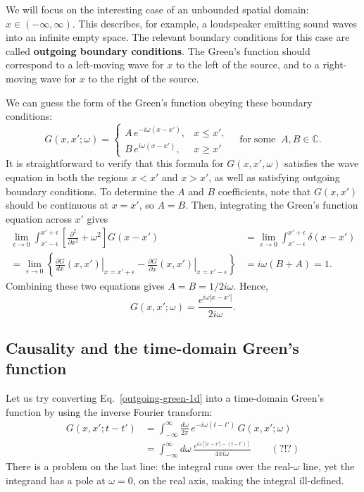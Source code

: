 \documentclass[10pt,a4paper]{article}
\begin{document}
We will focus on the interesting case of an unbounded spatial domain:
$x \in (-\infty, \infty)$. This describes, for example, a loudspeaker
emitting sound waves into an infinite empty space. The relevant
boundary conditions for this case are called \textbf{outgoing boundary
  conditions}. The Green's function should correspond to a left-moving
wave for $x$ to the left of the source, and to a right-moving wave for
$x$ to the right of the source.

We can guess the form of the Green's function obeying these boundary
conditions:
\begin{equation}
G(x,x';\omega) = \left\{\begin{array}{ll}A \, e^{-i\omega (x-x')}, & x \le x', \\ B \, e^{i\omega (x-x')}, & x \ge x'\end{array}\right. \quad \mathrm{for}\;\mathrm{some}\;\; A, B \in \mathbb{C}.
\end{equation}
It is straightforward to verify that this formula for $G(x,x',\omega)$
satisfies the wave equation in both the regions $x < x'$ and
$x > x'$, as well as satisfying outgoing boundary conditions. To
determine the $A$ and $B$ coefficients, note that $G(x,x')$ should
be continuous at $x = x'$, so $A = B$. Then, integrating the Green's
function equation across $x'$ gives
\begin{align}
  \lim_{\epsilon \rightarrow 0} \int_{x'-\epsilon}^{x'+\epsilon} \left[\frac{\partial^2}{\partial x^2} + \omega^2\right]G(x-x') &= \lim_{\epsilon \rightarrow 0} \int_{x'-\epsilon}^{x'+\epsilon} \delta(x-x') \\
  = \lim_{\epsilon \rightarrow 0} \left\{ \left.\frac{\partial G}{dx} (x,x') \right|_{x = x'+\epsilon} - \left.\frac{\partial G}{\partial x} (x,x') \right|_{x = x'-\epsilon}\right\} &= i\omega (B + A) = 1.
\end{align}
Combining these two equations gives $A = B = 1/2i\omega$. Hence,
\begin{equation}
G(x,x';\omega) = \frac{e^{i\omega |x-x'|}}{2i\omega}.
\label{outgoing-green-1d}
\end{equation}

\subsection{Causality and the time-domain Green's function}
\label{causality-and-the-time-domain-greens-function}

Let us try converting Eq.~\eqref{outgoing-green-1d} into a time-domain
Green's function by using the inverse Fourier transform:
\begin{align}
  G(x,x';t-t')
  &= \int_{-\infty}^\infty \frac{d\omega}{2\pi} \, e^{-i\omega (t-t')} \, G(x,x'; \omega) \\
  &= \int_{-\infty}^\infty d\omega \, \frac{e^{i\omega \left[|x-x'| - (t-t')\right]}}{4\pi i\omega}\qquad (?!?) \nonumber
\end{align}
There is a problem on the last line: the integral runs over the
real-$\omega$ line, yet the integrand has a pole at $\omega = 0$, on
the real axis, making the integral ill-defined.
\end{document}
